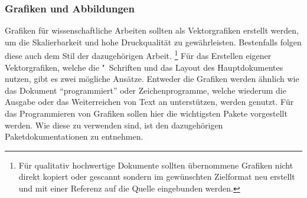 \begin{DeclarePackages}
\end{DeclarePackages}
%



\subsubsection{%
  Grafiken und Abbildungen%
}
%
Grafiken für wissenschaftliche Arbeiten sollten als Vektorgrafiken erstellt 
werden, um die Skalierbarkeit und hohe Druckqualität zu gewährleisten. 
Bestenfalls folgen diese auch dem Stil der dazugehörigen Arbeit.%
\footnote{%
  Für qualitativ hochwertige Dokumente sollten übernommene Grafiken nicht 
  direkt kopiert oder gescannt sondern im gewünschten Zielformat neu erstellt 
  und mit einer Referenz auf die Quelle eingebunden werden.%
}
Für das Erstellen eigener Vektorgrafiken, welche die "~Schriften 
und das Layout des Hauptdokumentes nutzen, gibt es zwei mögliche Ansätze. 
Entweder die Grafiken werden ähnlich wie das Dokument \enquote{programmiert} 
oder Zeichenprogramme, welche wiederum die Ausgabe oder das Weiterreichen von 
Text an  unterstützen, werden genutzt. Für das Programmieren von 
Grafiken sollen hier die wichtigsten Pakete vorgestellt werden. Wie diese zu 
verwenden sind, ist den dazugehörigen Paketdokumentationen zu entnehmen. 

